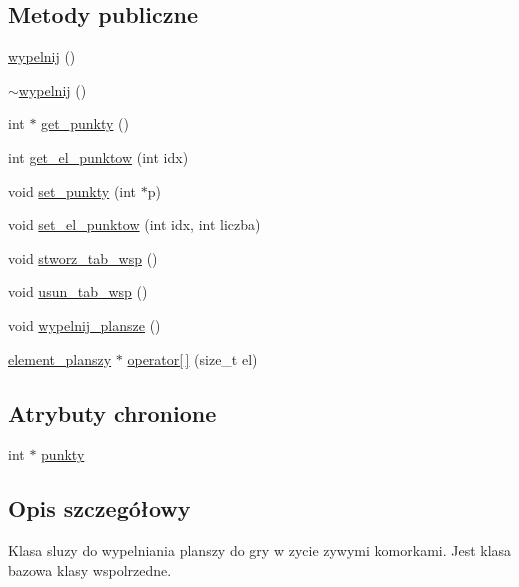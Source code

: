 \subsection*{Metody publiczne}
\begin{DoxyCompactItemize}
\item 
\mbox{\hyperlink{classwypelnij_a42b0cf405df96021ad482478d7886b9e}{wypelnij}} ()
\item 
\mbox{\hyperlink{classwypelnij_a3bb9c5b24d76cdef56f5683c03277d96}{$\sim$wypelnij}} ()
\item 
int $\ast$ \mbox{\hyperlink{classwypelnij_a5fb16bb1a4571f9c45c665bf3eac1089}{get\+\_\+punkty}} ()
\item 
int \mbox{\hyperlink{classwypelnij_aa30d2e93f672e9f4b35c842f52040019}{get\+\_\+el\+\_\+punktow}} (int idx)
\item 
void \mbox{\hyperlink{classwypelnij_a7127a46567e8f6defc6475c96a651c47}{set\+\_\+punkty}} (int $\ast$p)
\item 
void \mbox{\hyperlink{classwypelnij_a8da39f8d32230b2db5f87d0e4cebc83f}{set\+\_\+el\+\_\+punktow}} (int idx, int liczba)
\item 
void \mbox{\hyperlink{classwypelnij_a8dfa84177176a7069f959c988015006f}{stworz\+\_\+tab\+\_\+wsp}} ()
\item 
void \mbox{\hyperlink{classwypelnij_af326848988a108fa3ea9fe98afe31ea2}{usun\+\_\+tab\+\_\+wsp}} ()
\item 
void \mbox{\hyperlink{classwypelnij_a0bdc69f47a3ce9917e22b09c02e2ec86}{wypelnij\+\_\+plansze}} ()
\item 
\mbox{\hyperlink{classelement__planszy}{element\+\_\+planszy}} $\ast$ \mbox{\hyperlink{classwypelnij_a591374caf7e1350fcad469f47baa41e2}{operator\mbox{[}$\,$\mbox{]}}} (size\+\_\+t el)
\end{DoxyCompactItemize}
\subsection*{Atrybuty chronione}
\begin{DoxyCompactItemize}
\item 
int $\ast$ \mbox{\hyperlink{classwypelnij_a31de55fdeeb16737abb02d089ab339e8}{punkty}}
\end{DoxyCompactItemize}


\subsection{Opis szczegółowy}
Klasa sluzy do wypelniania planszy do gry w zycie zywymi komorkami. Jest klasa bazowa klasy wspolrzedne. 

